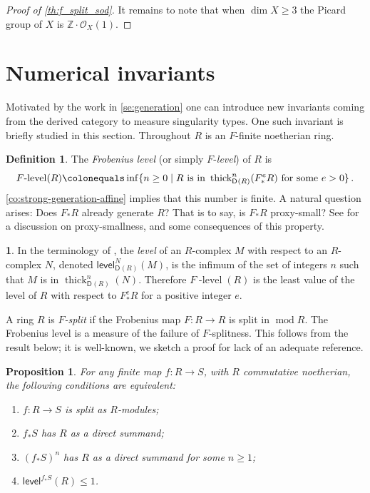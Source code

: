 \documentclass{amsart}
\newcommand{\dcat}[2][]{\cat{D}_{#1}(#2)}
\newcommand{\mco}{\mathcal{O}}
\newcommand{\cat}[1]{{\mathsf{#1}}}
\newcommand{\flevel}{F\!\operatorname{-level}}
\newcommand{\level}{\mathsf{level}}
\newcommand{\rmod}{\operatorname{mod}}
\newcommand{\thick}{\operatorname{thick}}
\newcounter{intro}
\newtheorem{proposition}[subsection]{Proposition}
\theoremstyle{definition}
\newtheorem{definition}[subsection]{Definition}
\newtheorem{chunk}[subsection]{}
\theoremstyle{remark}
\numberwithin{equation}{subsection}
\begin{document}
\begin{proof}[Proof of \cref{th:f_split_sod}]
 It remains to note that when $\dim X\ge 3$ the Picard group of $X$ is $\mathbb{Z}\cdot \mco_X (1)$. 
\end{proof}

\section{Numerical invariants}\label{se:new_invariants}

Motivated by the work in \cref{se:generation} one can introduce new invariants coming from the derived category to measure singularity types. One such invariant is briefly studied in this section. Throughout $R$ is an $F$-finite noetherian ring.

\begin{definition}
\label{d:F-level}
The \emph{Frobenius level} (or simply $F$-\emph{level}) of $R$ is
\[
\flevel(R)\colonequals \inf\{n\geq 0\mid R\text{ is in }\thick_{\dcat R}^n(F_*^eR) \text{ for some }e>0\}\,.
\]
\cref{co:strong-generation-affine} implies that this number is finite. A natural question arises: Does $F_*R$ already generate $R$? That is to say, is $F_*R$ proxy-small? See \cite{Dwyer/Greenlees/Iyengar:2006a,Dwyer/Greenlees/Iyengar:2006b} for a discussion on proxy-smallness, and some consequences of this property.
\end{definition}

\begin{chunk}
In the terminology of \cite{Avramov/Buchweitz/Iyengar/Miller:2010}, the \emph{level} of an $R$-complex $M$ with respect to an $R$-complex $N$, denoted $\level^N_{\dcat R}(M)$, is the infimum of the set of integers $n$ such that $M$ is in $\thick_{\dcat R}^n (N)$. Therefore $\flevel(R)$ is the least value of the level of $R$ with respect to $F_*^eR$ for a positive integer $e$.
\end{chunk}

A ring $R$ is \emph{$F$-split} if the Frobenius map $F\colon R\to R$ is split in $\rmod R$. The Frobenius level is a measure of the failure of $F$-splitness. This follows from the result below; it is well-known, we sketch a proof for lack of an adequate reference. 
	
\begin{proposition}
\label{pr:F_splitting_level}
For any finite map $f\colon R\to S$, with $R$  commutative noetherian, the following conditions are equivalent:
\begin{enumerate}[\quad\rm(1)]
    \item 
    $f\colon R\to S$ is split as $R$-modules;
    \item
    $f_*S$ has $R$ as a direct summand;
    \item
    $(f_*S)^n$ has $R$ as a direct summand for some $n\ge 1$;
    \item $\level^{f_*S}(R)\le 1$.
\end{enumerate}
\end{proposition}
\end{document}
